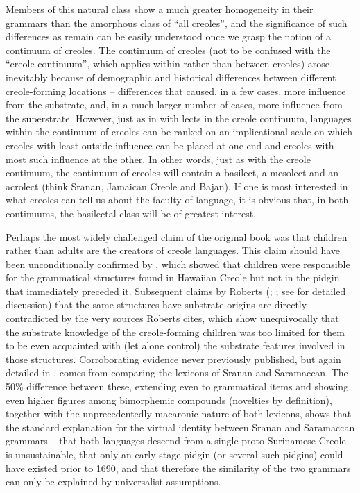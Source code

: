 Members of this natural class show a much greater homogeneity in their grammars than the amorphous class of “all creoles”, and the significance of such differences as remain can be easily understood once we grasp the notion of a continuum of creoles. The continuum of creoles (not to be confused with the “creole continuum”, which applies within rather than between creoles) arose inevitably because of demographic and historical differences between different creole-forming locations -- differences that caused, in a few cases, more influence from the substrate, and, in a much larger number of cases, more influence from the superstrate. However, just as in with lects in the creole continuum, languages within the continuum of creoles can be ranked on an implicational scale on which creoles with least outside influence can be placed at one end and creoles with most such influence at the other. In other words, just as with the creole continuum, the continuum of creoles will contain a basilect, a mesolect and an acrolect (think Sranan, Jamaican Creole and Bajan). If one is most interested in what creoles can tell us about the faculty of language, it is obvious that, in both continuums, the basilectal class will be of greatest interest.

Perhaps the most widely challenged claim of the original book was that children rather than adults are the creators of creole languages. This claim should have been unconditionally confirmed by \citet{Roberts1998}, which showed that children were responsible for the grammatical structures found in Hawaiian Creole but not in the pidgin that immediately preceded it. Subsequent claims by Roberts (\citeyear{Roberts2000}; \citeyear{Roberts2004}; see \citealt{Bickerton2014} for detailed discussion) that the same structures have substrate origins are directly contradicted by the very sources Roberts cites, which show unequivocally that the substrate knowledge of the creole-forming children was too limited for them to be even acquainted with (let alone control) the substrate features involved in those structures. Corroborating evidence never previously published, but again detailed in \citet{Bickerton2014}, comes from comparing the lexicons of Sranan and Saramaccan. The 50\% difference between these, extending even to grammatical items and showing even higher figures among bimorphemic compounds (novelties by definition), together with the unprecedentedly macaronic nature of both lexicons, shows that the standard explanation for the virtual identity between Sranan and Saramaccan grammars -- that both languages descend from a single proto-Surinamese Creole -- is unsustainable, that only an early-stage pidgin (or several such pidgins) could have existed prior to 1690, and that therefore the similarity of the two grammars can only be explained by universalist assumptions. 

